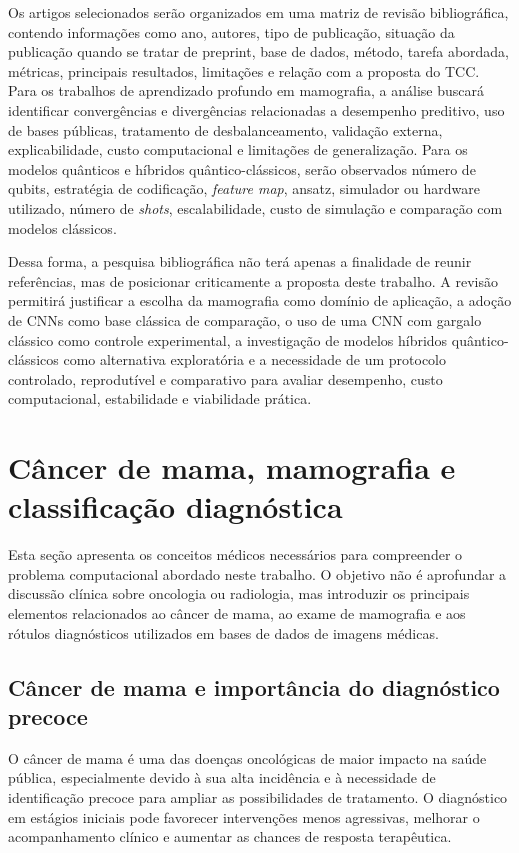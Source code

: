 \documentclass[
    12pt,
    openright,
    oneside,
    a4paper,
    english,
    brazil
]{abntex2}
\begin{document}
Os artigos selecionados serão organizados em uma matriz de revisão bibliográfica, contendo informações como ano, autores, tipo de publicação, situação da publicação quando se tratar de preprint, base de dados, método, tarefa abordada, métricas, principais resultados, limitações e relação com a proposta do TCC. Para os trabalhos de aprendizado profundo em mamografia, a análise buscará identificar convergências e divergências relacionadas a desempenho preditivo, uso de bases públicas, tratamento de desbalanceamento, validação externa, explicabilidade, custo computacional e limitações de generalização. Para os modelos quânticos e híbridos quântico-clássicos, serão observados número de qubits, estratégia de codificação, \textit{feature map}, ansatz, simulador ou hardware utilizado, número de \textit{shots}, escalabilidade, custo de simulação e comparação com modelos clássicos.

Dessa forma, a pesquisa bibliográfica não terá apenas a finalidade de reunir referências, mas de posicionar criticamente a proposta deste trabalho. A revisão permitirá justificar a escolha da mamografia como domínio de aplicação, a adoção de CNNs como base clássica de comparação, o uso de uma CNN com gargalo clássico como controle experimental, a investigação de modelos híbridos quântico-clássicos como alternativa exploratória e a necessidade de um protocolo controlado, reprodutível e comparativo para avaliar desempenho, custo computacional, estabilidade e viabilidade prática.

\section{Câncer de mama, mamografia e classificação diagnóstica}

Esta seção apresenta os conceitos médicos necessários para compreender o problema computacional abordado neste trabalho. O objetivo não é aprofundar a discussão clínica sobre oncologia ou radiologia, mas introduzir os principais elementos relacionados ao câncer de mama, ao exame de mamografia e aos rótulos diagnósticos utilizados em bases de dados de imagens médicas.

\subsection{Câncer de mama e importância do diagnóstico precoce}

O câncer de mama é uma das doenças oncológicas de maior impacto na saúde pública, especialmente devido à sua alta incidência e à necessidade de identificação precoce para ampliar as possibilidades de tratamento. O diagnóstico em estágios iniciais pode favorecer intervenções menos agressivas, melhorar o acompanhamento clínico e aumentar as chances de resposta terapêutica.
\end{document}
